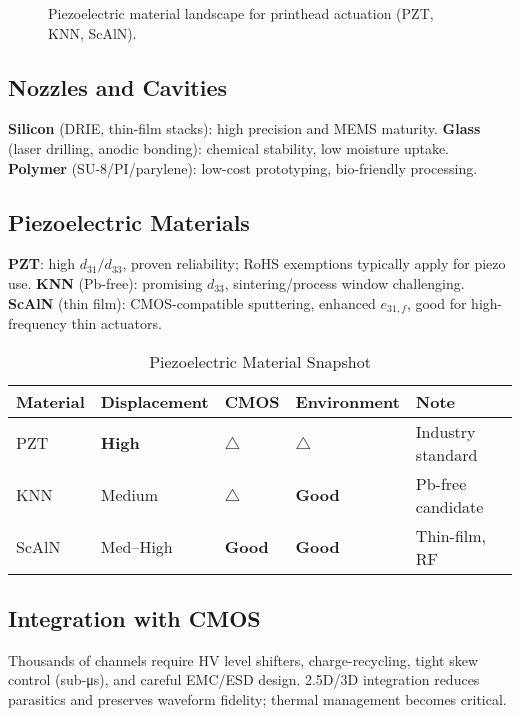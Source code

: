 \documentclass[conference]{IEEEtran}
\begin{document}
\begin{figure}[!t]
  \centering
  
  \caption{Piezoelectric material landscape for printhead actuation (PZT, KNN, ScAlN).}
  \label{fig:piezo_materials}
\end{figure}

\subsection{Nozzles and Cavities}
\textbf{Silicon} (DRIE, thin-film stacks): high precision and MEMS maturity. 
\textbf{Glass} (laser drilling, anodic bonding): chemical stability, low moisture uptake. 
\textbf{Polymer} (SU-8/PI/parylene): low-cost prototyping, bio-friendly processing.

\subsection{Piezoelectric Materials}
\textbf{PZT}: high $d_{31}/d_{33}$, proven reliability; RoHS exemptions typically apply for piezo use. 
\textbf{KNN} (Pb-free): promising $d_{33}$, sintering/process window challenging. 
\textbf{ScAlN} (thin film): CMOS-compatible sputtering, enhanced $e_{31,f}$, good for high-frequency thin actuators.

\begin{table}[!t]
\caption{Piezoelectric Material Snapshot}
\label{tab:piezo}
\centering
\begin{tabular}{@{}lllll@{}}
\toprule
Material & Displacement & CMOS & Environment & Note \\
\midrule
PZT   & \textbf{High} & $\triangle$ & $\triangle$ & Industry standard \\
KNN   & Medium & $\triangle$ & \textbf{Good} & Pb-free candidate \\
ScAlN & Med--High & \textbf{Good} & \textbf{Good} & Thin-film, RF \\
\bottomrule
\end{tabular}
\end{table}

\subsection{Integration with CMOS}
Thousands of channels require HV level shifters, charge-recycling, tight skew control (sub-\si{\micro s}), and careful EMC/ESD design. 2.5D/3D integration reduces parasitics and preserves waveform fidelity; thermal management becomes critical.
\end{document}
